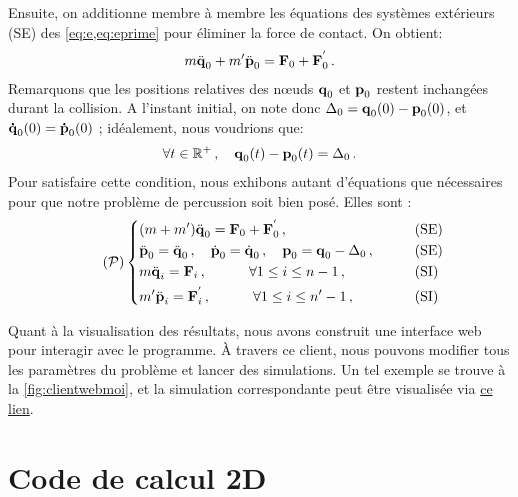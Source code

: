 \noindent Ensuite, on additionne membre à membre les équations des systèmes extérieurs (SE) des \cref{eq:e,eq:eprime} pour éliminer la force de contact. On obtient:
\begin{align}
m \ddot{\bm{\mathrm{q}}}_0 + m' \ddot{\bm{\mathrm{p}}}_0 = \bm{\mathrm{F}}_0 + \bm{\mathrm{F}}^{'}_0 \,.
\end{align}
Remarquons que les positions relatives des n\oe{}uds $\bm{\mathrm{q}}_0$ et $\bm{\mathrm{p}}_0$ restent inchangées durant la collision. A l'instant initial, on note donc $\Delta_0 = \bm{\mathrm{q}}_0(0) - \bm{\mathrm{p}}_0(0)$, et $\bm{\mathrm{\dot q}}_0(0) = \bm{\mathrm{\dot p}}_0(0)$ ; idéalement, nous voudrions que:
\begin{align}
\forall t \in \mathbb{R}^+ \,, \quad \bm{\mathrm{q}}_0(t) - \bm{\mathrm{p}}_0(t) = \Delta_0\,.
\end{align}
Pour satisfaire cette condition, nous exhibons autant d'équations que nécessaires pour que notre problème de percussion soit bien posé. Elles sont :
\begin{align} \tag{$\mathcal{P}$} \label{eq:problemeP}
\begin{dcases}
    (m+m') \ddot{\bvec{q}}_0  = \bvec{F}_0 + \bvec{F}^{'}_0  \,, &\qquad \text{(SE)} \\
    \ddot{\bvec{p}}_0 = \ddot{\bvec{q}}_0 \,, \quad \dot{\bvec{p}}_0 = \dot{\bvec{q}}_0 \,, \quad \bvec{p}_0 = \bvec{q}_0 - \Delta_0 \,, &\qquad \text{(SE)} \\
    m \ddot{\bvec{q}}_i = \bvec{F}_i   \,, \quad \quad \quad \forall 1 \leq i \leq n-1 \,, &\qquad \text{(SI)} \\
    m' \ddot{\bvec{p}}_i = \bvec{F}^{'}_i   \,, \quad \quad \quad \forall 1 \leq i \leq n'-1 \,, &\qquad \text{(SI)}
\end{dcases}
\end{align}

Quant à la visualisation des résultats, nous avons construit une interface web pour interagir avec le programme. À travers ce client, nous pouvons modifier tous les paramètres du problème et lancer des simulations. Un tel exemple se trouve à la \cref{fig:clientwebmoi}, et la simulation correspondante peut être visualisée via \href{https://seafile.unistra.fr/f/5e9baa748e89426eb017/}{ce lien}. 





\section{Code de calcul 2D}


